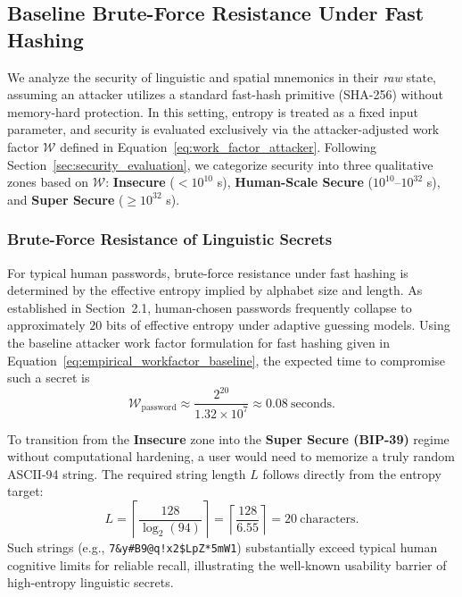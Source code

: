 \documentclass[journal,article,accept,pdftex,moreauthors]{Definitions/mdpi}
\begin{document}
\subsection{Baseline Brute-Force Resistance Under Fast Hashing}
\label{sec:unhardened_analysis}

We analyze the security of linguistic and spatial mnemonics in their \emph{raw} state, assuming an attacker utilizes a standard fast-hash primitive (SHA-256) without memory-hard protection. In this setting, entropy is treated as a fixed input parameter, and security is evaluated exclusively via the attacker-adjusted work factor $\mathcal{W}$ defined in Equation~\ref{eq:work_factor_attacker}. Following Section~\ref{sec:security_evaluation}, we categorize security into three qualitative zones based on $\mathcal{W}$: \textbf{Insecure} ($<10^{10}$ s), \textbf{Human-Scale Secure} ($10^{10}$--$10^{32}$ s), and \textbf{Super Secure} ($\ge 10^{32}$ s).

\subsubsection{Brute-Force Resistance of Linguistic Secrets}

For typical human passwords, brute-force resistance under fast hashing is determined by the effective entropy implied by alphabet size and length. As established in Section~2.1, human-chosen passwords frequently collapse to approximately $20$ bits of effective entropy under adaptive guessing models. Using the baseline attacker work factor formulation for fast hashing given in Equation~\ref{eq:empirical_workfactor_baseline}, the expected time to compromise such a secret is
\begin{equation}
\mathcal{W}_{\text{password}} \approx \frac{2^{20}}{1.32 \times 10^7} \approx 0.08 \ \text{seconds}.
\end{equation}

To transition from the \textbf{Insecure} zone into the \textbf{Super Secure (BIP-39)} regime without computational hardening, a user would need to memorize a truly random ASCII-94 string. The required string length $L$ follows directly from the entropy target:
\begin{equation}
L = \left\lceil \frac{128}{\log_2(94)} \right\rceil = \left\lceil \frac{128}{6.55} \right\rceil = 20 \ \text{characters}.
\end{equation}
Such strings (e.g., \texttt{7\&y\#B9@q!x2\$LpZ*5mW1}) substantially exceed typical human cognitive limits for reliable recall, illustrating the well-known usability barrier of high-entropy linguistic secrets.
\end{document}
